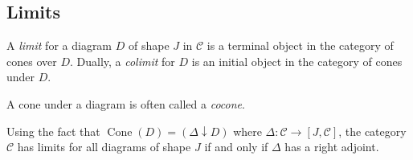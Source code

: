 \subsection{Limits}
\begin{definition}
    A \emph{limit} for a diagram \( D \) of shape \( J \) in \( \mathcal C \) is a terminal object in the category of cones over \( D \).
    Dually, a \emph{colimit} for \( D \) is an initial object in the category of cones under \( D \).
\end{definition}
A cone under a diagram is often called a \emph{cocone}.
\begin{remark}
    Using the fact that \( \operatorname{Cone}(D) = (\Delta \downarrow D) \) where \( \Delta : \mathcal C \to [J, \mathcal C] \), the category \( \mathcal C \) has limits for all diagrams of shape \( J \) if and only if \( \Delta \) has a right adjoint.
\end{remark}
